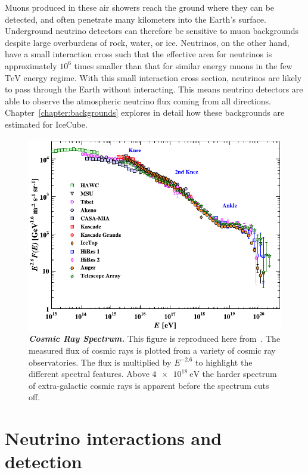 Muons produced in these air showers reach the ground where they can be detected, and often penetrate many kilometers into the Earth's surface.
Underground neutrino detectors can therefore be sensitive to muon backgrounds despite large overburdens of rock, water, or ice.
Neutrinos, on the other hand, have a small interaction cross such that the effective area for neutrinos is approximately $10^6$ times smaller than that for similar energy muons in the few $\si\TeV$ energy regime.
With this small interaction cross section, neutrinos are likely to pass through the Earth without interacting.
This means neutrino detectors are able to observe the atmospheric neutrino flux coming from all directions.
Chapter~\ref{chapter:backgrounds} explores in detail how these backgrounds are estimated for IceCube.

\begin{figure}
	\centering
	\includegraphics[width=0.8\linewidth]{figures/cosmic_ray_spectrum}
	\internallinenumbers
	\caption{\textbf{\textit{Cosmic Ray Spectrum.}}
		This figure is reproduced here from~\cite{PhysRevD.98.030001}.
		The measured flux of cosmic rays is plotted from a variety of cosmic ray observatories.
		The flux is multiplied by $E^{-2.6}$ to highlight the different spectral features.
		Above $\SI{4e18}\eV$ the harder spectrum of extra-galactic cosmic rays is apparent before the spectrum cuts off.
	}\label{fig:cosmic_ray_spectrum}
\end{figure}

\section{Neutrino interactions and detection}

